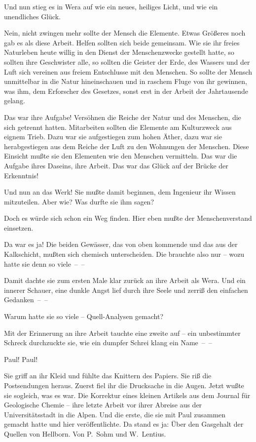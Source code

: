 Und nun stieg es in Wera auf wie ein neues, heiliges Licht, und wie
ein unendliches Glück.

Nein, nicht zwingen mehr sollte der Mensch die Elemente. Etwas
Größeres noch gab es als diese Arbeit. Helfen sollten sich beide
gemeinsam. Wie sie ihr freies Naturleben heute willig in den Dienst
der Menschenzwecke gestellt hatte, so sollten ihre Geschwister
alle, so sollten die Geister der Erde, des Wassers und der Luft
sich vereinen aus freiem Entschlusse mit den Menschen. So sollte
der Mensch unmittelbar in die Natur hineinschauen und in raschem
Fluge von ihr gewinnen, was ihm, dem Erforscher des Gesetzes, sonst
erst in der Arbeit der Jahrtausende gelang.

Das war ihre Aufgabe! Versöhnen die Reiche der Natur und des
Menschen, die sich getrennt hatten. Mitarbeiten sollten die
Elemente am Kulturzweck aus eignem Trieb. Dazu war sie aufgestiegen
zum hohen Äther, dazu war sie herabgestiegen aus dem Reiche der
Luft zu den Wohnungen der Menschen. Diese Einsicht mußte sie den
Elementen wie den Menschen vermitteln. Das war die Aufgabe ihres
Daseins, ihre Arbeit. Das war das Glück auf der Brücke der
Erkenntnis!

Und nun an das Werk! Sie mußte damit beginnen, dem Ingenieur ihr
Wissen mitzuteilen. Aber wie? Was durfte sie ihm sagen?

Doch es würde sich schon ein Weg finden. Hier eben mußte der
Menschenverstand einsetzen.

Da war es ja! Die beiden Gewässer, das von oben kommende und das
aus der Kalkschicht, mußten sich chemisch unterscheiden. Die
brauchte also nur – wozu hatte sie denn so viele~–~–

Damit dachte sie zum ersten Male klar zurück an ihre Arbeit als
Wera. Und ein innerer Schauer, eine dunkle Angst lief durch ihre
Seele und zerriß den einfachen Gedanken~–~–

Warum hatte sie so viele – Quell-Analysen gemacht?

Mit der Erinnerung an ihre Arbeit tauchte eine zweite auf – ein
unbestimmter Schreck durchzuckte sie, wie ein dumpfer Schrei klang
ein Name~–~–

Paul! Paul!

Sie griff an ihr Kleid und fühlte das Knittern des Papiers. Sie riß
die Postsendungen heraus. Zuerst fiel ihr die Drucksache in die
Augen. Jetzt wußte sie sogleich, was es war. Die Korrektur eines
kleinen Artikels aus dem Journal für Geologische Chemie – ihre
letzte Arbeit vor ihrer Abreise aus der Universitätsstadt in die
Alpen. Und die erste, die sie mit Paul zusammen gemacht hatte und
hier veröffentlichte. Da stand es ja: Über den Gasgehalt der
Quellen von Hellborn. Von P.~Sohm und W.~Lentius.

